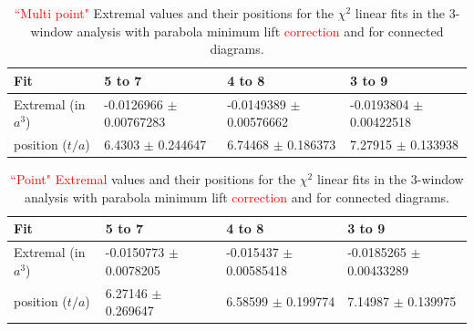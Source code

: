 \begin{table}
\begin{center}
    \begin{tabular}{ | l | p{2.2cm} | p{2.2cm} | p{2.2cm} |}
    \hline
     Fit & 5 to 7   &4 to 8   & 3 to 9  \\ \hline
     Extremal (in $a^3$)&  -0.0126966 $\pm$ 0.00767283  &  -0.0149389 $\pm$ 0.00576662  & -0.0193804 $\pm$ 0.00422518  \\ \hline
     position ($t/a$)& 6.4303 $\pm$ 0.244647  & 6.74468 $\pm$ 0.186373   &  7.27915 $\pm$ 0.133938   \\ \hline
    \end{tabular}
\end{center}
\caption{\textcolor{red}{``Multi point"} Extremal values and their positions for the $\chi^2$ linear fits in the 3-window analysis with parabola minimum lift \textcolor{red}{correction} and for connected diagrams.}
\label{Table:ConnectedMultipoint}
\end{table}

\begin{table}
\begin{center}
    \begin{tabular}{ | l | p{2.2cm} | p{2.2cm} | p{2.2cm} |}
    \hline
     Fit & 5 to 7   &4 to 8   & 3 to 9  \\ \hline
     Extremal (in $a^3$)&   -0.0150773 $\pm$ 0.0078205   &   -0.015437 $\pm$ 0.00585418   &  -0.0185265 $\pm$ 0.00433289   \\ \hline
     position ($t/a$)&  6.27146 $\pm$ 0.269647  &  6.58599 $\pm$ 0.199774    &  7.14987 $\pm$ 0.139975    \\ \hline
    \end{tabular}
\end{center}
\caption{\textcolor{red}{``Point" Extremal} values and their positions for the $\chi^2$ linear fits in the 3-window analysis with parabola minimum lift \textcolor{red}{correction} and for connected diagrams.}
\label{Table:ConnectedPoint}
\end{table}

